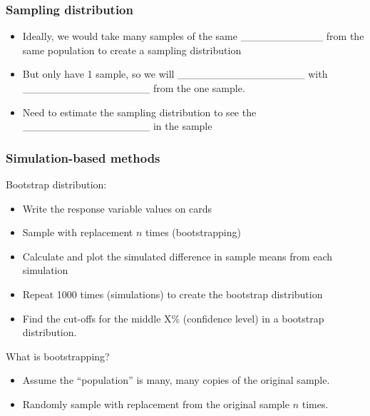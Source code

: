 \documentclass[
]{report}
\begin{document}

\subsubsection*{Sampling distribution}\label{sampling-distribution}


\begin{itemize}
\item
  Ideally, we would take many samples of the same \_\_\_\_\_\_\_\_\_\_\_ from the same population to create a sampling distribution
\item
  But only have 1 sample, so we will \_\_\_\_\_\_\_\_\_\_\_\_\_\_\_\_\_ with \_\_\_\_\_\_\_\_\_\_\_\_\_\_\_\_\_ from the one sample.
\item
  Need to estimate the sampling distribution to see the \_\_\_\_\_\_\_\_\_\_\_\_\_\_\_\_\_ in the sample
\end{itemize}


\subsubsection*{Simulation-based methods}\label{simulation-based-methods}

Bootstrap distribution:

\begin{itemize}
\item
  Write the response variable values on cards
\item
  Sample with replacement \(n\) times (bootstrapping)
\item
  Calculate and plot the simulated difference in sample means from each simulation
\item
  Repeat 1000 times (simulations) to create the bootstrap distribution
\item
  Find the cut-offs for the middle X\% (confidence level) in a bootstrap distribution.
\end{itemize}

What is bootstrapping?

\begin{itemize}
\item
  Assume the ``population'' is many, many copies of the original sample.
\item
  Randomly sample with replacement from the original sample \(n\) times.
\end{itemize}
\end{document}
